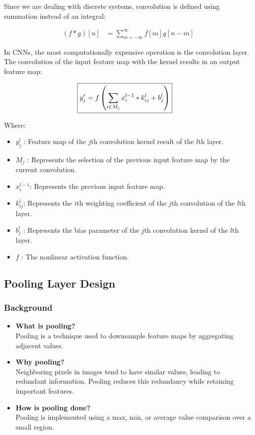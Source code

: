 \documentclass{article}
\begin{document}
Since we are dealing with discrete systems, convolution is defined using summation instead of an integral:

\begin{align*}
  \left( f * g \right) \left[ n \right] &= \sum_{m = -\infty}^{\infty} f \left[ m\right] g \left[ n-m \right]
\end{align*}

In CNNs, the most computationally expensive operation is the convolution layer. The convolution of the input feature map with the kernel results in an output feature map:

\begin{align*}
  \Aboxed{  y'_j = f \left( \sum_{i \in M_j}^{} x^{l-1}_{i}  * k^l_{ij} + b^l_{j}\right)}
\end{align*}

Where:
\begin{itemize}
  \item \( y^{l}_j \) : Feature map of the \( j \)th convolution kernel result of the \( l  \)th layer.
  \item \( M_{j} \) : Represents the selection of the previous input feature map by the current convolution.
  \item \( x_{i }^{l-1} \): Represents the previous input feature map.
  \item \( k_{ij}^l  \): Represents the \( i  \)th weighting coefficient of the \( j  \)th convolution of the \( l  \)th layer.
  \item \( b^{l }_j \) : Represents the bias parameter of the \( j  \)th convolution kernel of the \( l  \)th layer.
  \item \( f \) : The nonlinear activation function.
\end{itemize}

\subsection{Pooling Layer Design}
\subsubsection{Background}
\begin{itemize}
  \item \textbf{What is pooling?} \\
    Pooling is a technique used to downsample feature maps by aggregating adjacent values.
  \item \textbf{Why pooling?} \\
    Neighboring pixels in images tend to have similar values, leading to redundant information. Pooling reduces this redundancy while retaining important features.
  \item \textbf{How is pooling done?} \\
    Pooling is implemented using a max, min, or average value comparison over a small region.
\end{itemize}
\end{document}
